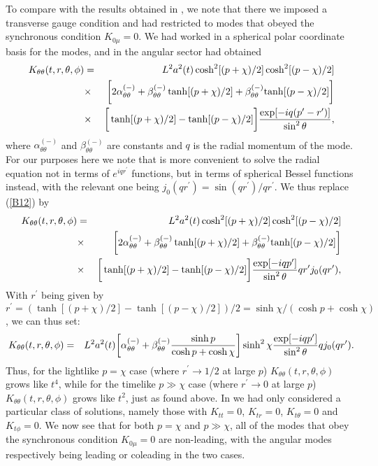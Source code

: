 To compare with the results obtained in \cite{mannheim_2012}, we note that there we imposed a  transverse gauge condition and had restricted to modes that obeyed the synchronous condition $K_{0\mu}=0$. We had worked in a spherical polar coordinate basis for the modes, and in the angular sector had obtained 
%
\begin{eqnarray}
K_{\theta\theta}(t,r,\theta,\phi)&=&L^2a^2(t)\cosh^2[(p+\chi)/2]\cosh^2[(p-\chi)/2]
\\
&\times&\bigg{[}2\alpha^{(-)}_{\theta\theta}+\beta^{(-)}_{\theta\theta}\tanh[(p+\chi)/2]+\beta^{(-)}_{\theta\theta}{\rm tanh}[(p-\chi)/2]\bigg{]}
\nonumber\\
&\times&\bigg{[}\tanh[(p+\chi)/2]-\tanh[(p-\chi)/2]\bigg{]}\frac{\exp[-iq(p^{\prime}-r^{\prime})]}{\sin^2\theta},
\nonumber
\label{B12}
\end{eqnarray}
%
where $\alpha^{(-)}_{\theta\theta}$ and $\beta^{(-)}_{\theta\theta}$ are constants and $q$ is the radial momentum of the mode. For our purposes here we note that is more convenient to solve the radial equation not in terms of $e^{iqr^{\prime}}$ functions, but in terms of spherical Bessel functions instead, with the relevant one being $j_0(qr^{\prime})=\sin(qr^{\prime})/qr^{\prime}$. We thus replace (\ref{B12}) by
%
\begin{eqnarray}
K_{\theta\theta}(t,r,\theta,\phi)&=&L^2a^2(t)\cosh^2[(p+\chi)/2]\cosh^2[(p-\chi)/2]
\\
&\times&\bigg{[}2\alpha^{(-)}_{\theta\theta}+\beta^{(-)}_{\theta\theta}\tanh[(p+\chi)/2]+\beta^{(-)}_{\theta\theta}{\rm tanh}[(p-\chi)/2]\bigg{]}
\nonumber\\
&\times&\bigg{[}\tanh[(p+\chi)/2]-\tanh[(p-\chi)/2]\bigg{]}\frac{\exp[-iqp^{\prime}]}{\sin^2\theta}qr^{\prime}j_0(qr^{\prime}),
\nonumber
\label{B13}
\end{eqnarray}
%
With $r^{\prime}$ being given by $r^{\prime}=(\tanh[(p+\chi)/2]-\tanh[(p-\chi)/2])/2=\sinh\chi/(\cosh p+\cosh \chi)$,  we can thus set: 
%
\begin{eqnarray}
K_{\theta\theta}(t,r,\theta,\phi)&=&L^2a^2(t)\bigg{[}\alpha^{(-)}_{\theta\theta}
+\beta^{(-)}_{\theta\theta}\frac{\sinh p}{\cosh p +\cosh \chi}\bigg{]}\sinh^2\chi\frac{\exp[-iqp^{\prime}]}{\sin^2\theta}qj_0(qr^{\prime}).
\nonumber\\
\label{B14}
\end{eqnarray}
%
Thus, for the lightlike $p=\chi$ case (where $r^{\prime}\rightarrow 1/2$ at large $p$) $K_{\theta\theta}(t,r,\theta,\phi)$ grows like $t^4$, while for the timelike $p\gg \chi$ case (where $r^{\prime}\rightarrow 0$ at large $p$) $K_{\theta\theta}(t,r,\theta,\phi)$ grows like $t^2$, just as found above. In \cite{mannheim_2012} we had only considered a particular class of solutions, namely those with $K_{tt}=0$, $K_{tr}=0$, $K_{t\theta}=0$ and $K_{t\phi}=0$. We now see that for both $p=\chi$ and $p \gg \chi$, all of the modes that obey the synchronous condition $K_{0\mu}=0$  are non-leading, with the angular modes respectively being leading or coleading in the two cases.




